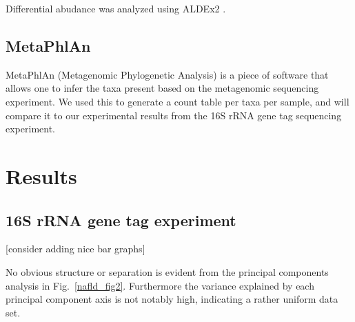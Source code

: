 Differential abudance was analyzed using ALDEx2 \cite{fernandes2014unifying}.

\subsection{MetaPhlAn}

MetaPhlAn (Metagenomic Phylogenetic Analysis) \cite{segata2012metagenomic} is a piece of software that allows one to infer the taxa present based on the metagenomic sequencing experiment. We used this to generate a count table per taxa per sample, and will compare it to our experimental results from the 16S rRNA gene tag sequencing experiment.

\section{Results}

\subsection{16S rRNA gene tag experiment}

[consider adding nice bar graphs]

No obvious structure or separation is evident from the principal components analysis in Fig.~\ref{nafld_fig2}. Furthermore the variance explained by each principal component axis is not notably high, indicating a rather uniform data set.


